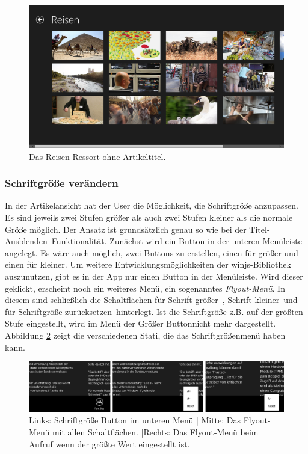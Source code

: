 \documentclass[12pt,a4paper,bibtotoc,abstracton]{scrartcl}
\begin{document}
\begin{figure}[h]
	\centering
	\includegraphics[width=\textwidth]{Bilder/Screenshots/app/reise_aegypten_3gdohne.png} 
	\caption{Das Reisen-Ressort ohne Artikeltitel.}
	\label{fig:ressortohnetitel}
\end{figure}

\subsubsection{Schriftgröße verändern}
\label{subsubsec:schriftgroesseveraendern}
In der Artikelansicht hat der User die Möglichkeit, die Schriftgröße anzupassen. Es sind jeweils zwei Stufen größer als auch zwei Stufen kleiner als die normale Größe möglich. Der  Ansatz ist grundsätzlich genau so wie bei der \glqq Titel-Ausblenden\grqq\ Funktionalität. Zunächst wird ein Button in der unteren Menüleiste angelegt. Es wäre auch möglich, zwei Buttons zu erstellen, einen für größer und einen für kleiner. Um weitere  Entwicklungsmöglichkeiten der \ac{winjs}-Bibliothek auszunutzen, gibt es in der App nur einen Button in der Menüleiste. Wird dieser geklickt, erscheint noch ein weiteres Menü, ein sogenanntes \textit{Flyout-Menü}. In diesem sind schließlich die Schaltflächen für \glqq Schrift größer\grqq\ , \glqq Schrift kleiner\grqq\ und für \glqq Schriftgröße zurücksetzen\grqq\ hinterlegt. Ist die Schriftgröße z.B. auf der größten Stufe eingestellt, wird im Menü der \glqq Größer Button\grqq nicht mehr dargestellt. Abbildung \ref{fig:fontsizemenü} zeigt die verschiedenen Stati, die das Schriftgrößenmenü haben kann.

\begin{figure}[h]
	\centering
	\includegraphics[width=\textwidth]{Bilder/Screenshots/app/font_size_menu_kompakt.png} 
	\caption[Die Schriftgröße-Buttons]{Links: Schriftgröße Button im unteren Menü | Mitte: Das Flyout-Menü mit allen Schaltflächen. |Rechts: Das Flyout-Menü beim Aufruf wenn der größte Wert eingestellt ist.}
	\label{fig:fontsizemenü}
\end{figure} 
\end{document}
